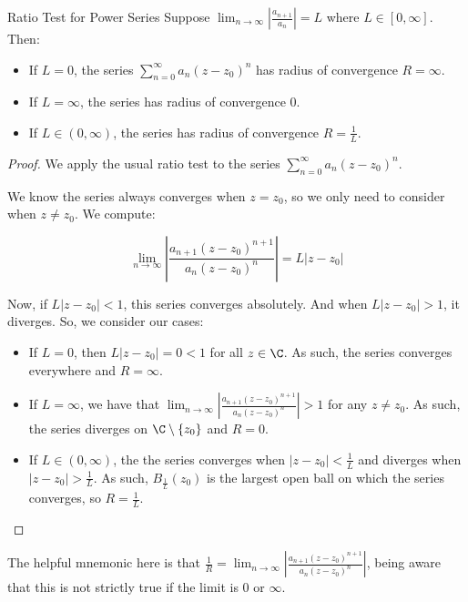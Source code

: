 \begin{thmbo}{Ratio Test for Power Series}{}
Suppose $\lim_{n \rightarrow \infty} \left|\frac{a_{n+1}}{a_n}\right| = L$ where $L \in [0,\infty]$. Then:

\begin{itemize} 
\item If $L = 0$, the series $\sum_{n = 0}^\infty a_n(z-z_0)^n$ has radius of convergence $R = \infty$.
\item If $L = \infty$, the series has radius of convergence $0$.
\item If $L\in (0,\infty)$, the series has radius of convergence $R = \frac{1}{L}$.
\end{itemize}
\end{thmbo}

\begin{proof} We apply the usual ratio test to the series $\sum_{n = 0}^\infty a_n(z-z_0)^n$.

We know the series always converges when $z = z_0$, so we only need to consider when $z\ne z_0$. We compute:

$$\lim_{n\rightarrow\infty} \left|\frac{a_{n+1}(z-z_0)^{n+1}}{a_n(z-z_0)^n}\right| = L|z-z_0|$$

Now, if $L|z-z_0| < 1$, this series converges absolutely. And when $L|z-z_0| > 1$, it diverges. So, we consider our cases:

\begin{itemize}
\item If $L = 0$, then $L|z-z_0| = 0<1$ for all $z\in \C$. As such, the series converges everywhere and $R = \infty$.
\item If $L = \infty$, we have that $\lim_{n\rightarrow\infty} \left|\frac{a_{n+1}(z-z_0)^{n+1}}{a_n(z-z_0)^n}\right| > 1$ for any $z\ne z_0$. As such, the series diverges on $\C\setminus\{z_0\}$ and $R = 0$.
\item If $L\in (0,\infty)$, the the series converges when $|z-z_0|< \frac{1}{L}$ and diverges when $|z-z_0| > \frac{1}{L}$. As such, $B_{\frac{1}{L}}(z_0)$ is the largest open ball on which the series converges, so $R = \frac{1}{L}$.
\end{itemize}
\end{proof}


The helpful mnemonic here is that $\frac{1}{R} = \lim_{n\rightarrow\infty} \left|\frac{a_{n+1}(z-z_0)^{n+1}}{a_n(z-z_0)^n}\right|$, being aware that this is not strictly true if the limit is $0$ or $\infty$. 

